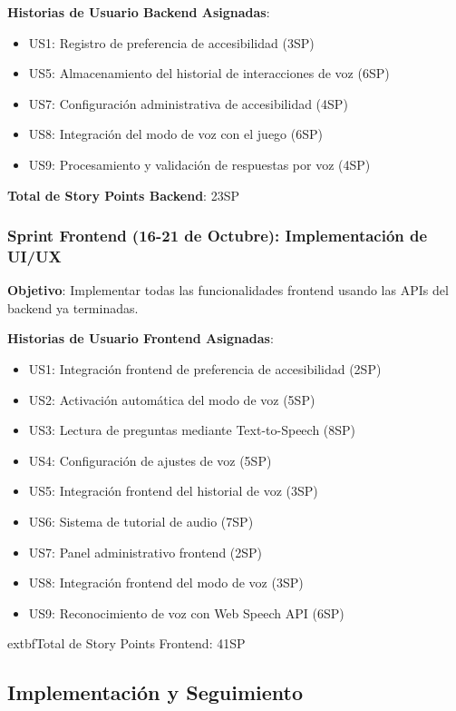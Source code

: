 \documentclass[12pt]{article}
\begin{document}
\textbf{Historias de Usuario Backend Asignadas}:
\begin{itemize}
    \item US1: Registro de preferencia de accesibilidad (3SP)
    \item US5: Almacenamiento del historial de interacciones de voz (6SP)
    \item US7: Configuración administrativa de accesibilidad (4SP)
    \item US8: Integración del modo de voz con el juego (6SP)
    \item US9: Procesamiento y validación de respuestas por voz (4SP)
\end{itemize}

\textbf{Total de Story Points Backend}: 23SP

\subsubsection{Sprint Frontend (16-21 de Octubre): Implementación de UI/UX}
\textbf{Objetivo}: Implementar todas las funcionalidades frontend usando las APIs del backend ya terminadas.

\textbf{Historias de Usuario Frontend Asignadas}:
\begin{itemize}
    \item US1: Integración frontend de preferencia de accesibilidad (2SP)
    \item US2: Activación automática del modo de voz (5SP)
    \item US3: Lectura de preguntas mediante Text-to-Speech (8SP)
    \item US4: Configuración de ajustes de voz (5SP)
    \item US5: Integración frontend del historial de voz (3SP)
    \item US6: Sistema de tutorial de audio (7SP)
    \item US7: Panel administrativo frontend (2SP)
    \item US8: Integración frontend del modo de voz (3SP)
    \item US9: Reconocimiento de voz con Web Speech API (6SP)
\end{itemize}

	extbf{Total de Story Points Frontend}: 41SP

\subsection{Implementación y Seguimiento}
\end{document}
